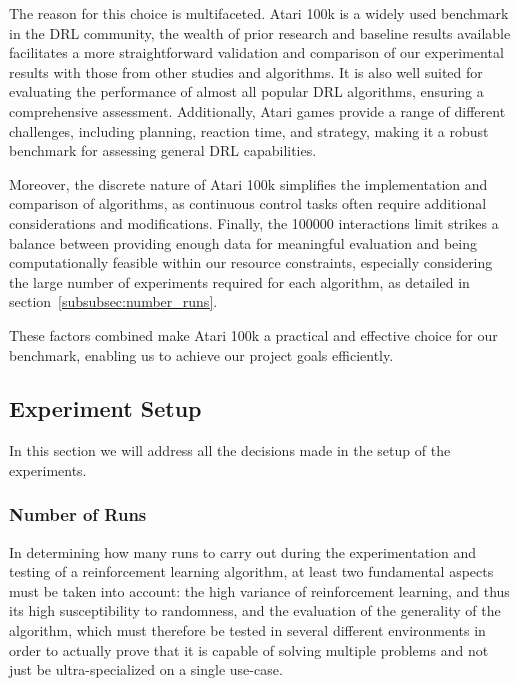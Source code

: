 The reason for this choice is multifaceted. Atari 100k is a widely used benchmark in the DRL community, the wealth of prior research and baseline results available facilitates a more straightforward validation and comparison of our experimental results with those from other studies and algorithms. It is also well suited for evaluating the performance of almost all popular DRL algorithms, ensuring a comprehensive assessment. Additionally, Atari games provide a range of different challenges, including planning, reaction time, and strategy, making it a robust benchmark for assessing general DRL capabilities.

Moreover, the discrete nature of Atari 100k simplifies the implementation and comparison of algorithms, as continuous control tasks often require additional considerations and modifications. Finally, the \num{100000} interactions limit strikes a balance between providing enough data for meaningful evaluation and being computationally feasible within our resource constraints, especially considering the large number of experiments required for each algorithm, as detailed in section~\vref{subsubsec:number_runs}.

These factors combined make Atari 100k a practical and effective choice for our benchmark, enabling us to achieve our project goals efficiently.


\subsection{Experiment Setup}
\label{subsec:experiment_setup}
In this section we will address all the decisions made in the setup of the experiments.

\subsubsection{Number of Runs}
\label{subsubsec:number_runs}

In determining how many runs to carry out during the experimentation and testing of a reinforcement learning algorithm, at least two fundamental aspects must be taken into account: the high variance of reinforcement learning, and thus its high susceptibility to randomness, and the evaluation of the generality of the algorithm, which must therefore be tested in several different environments in order to actually prove that it is capable of solving multiple problems and not just be ultra-specialized on a single use-case.

